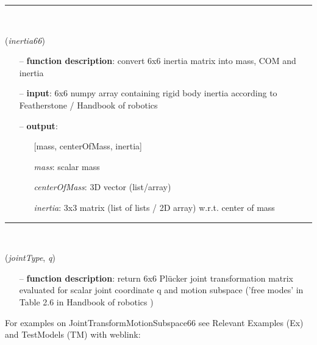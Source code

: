 \begin{itemize}[leftmargin=1.4cm]
\begin{itemize}[leftmargin=1.4cm]
\begin{itemize}[leftmargin=0.5cm]
\begin{itemize}[leftmargin=1.4cm]
\begin{itemize}[leftmargin=1.4cm]
\begin{itemize}[leftmargin=0.5cm]
\begin{itemize}[leftmargin=1.4cm]
\begin{itemize}[leftmargin=0.5cm]
\begin{itemize}[leftmargin=1.4cm]
\begin{itemize}[leftmargin=1.4cm]
\begin{itemize}[leftmargin=1.4cm]
%
\noindent\rule{8cm}{0.75pt}\vspace{1pt} \\ 
\begin{flushleft}
\label{sec:kinematicTree:Inertia66toMassCOMinertia}
({\it inertia66})
\end{flushleft}
\setlength{\itemindent}{0.7cm}
\begin{itemize}[leftmargin=0.7cm]
\item[--]{\bf function description}: convert 6x6 inertia matrix into mass, COM and inertia
\item[--]{\bf input}: 6x6 numpy array containing rigid body inertia according to Featherstone / Handbook of robotics \cite{Siciliano2016}
\item[--]{\bf output}: \vspace{-6pt}
\begin{itemize}[leftmargin=1.2cm]
\setlength{\itemindent}{-0.7cm}
\item[][mass, centerOfMass, inertia]
\item[]{\it mass}: scalar mass
\item[]{\it centerOfMass}: 3D vector (list/array)
\item[]{\it inertia}: 3x3 matrix (list of lists / 2D array) w.r.t. center of mass
\end{itemize}
\vspace{12pt}\end{itemize}
%
\noindent\rule{8cm}{0.75pt}\vspace{1pt} \\ 
\begin{flushleft}
\label{sec:kinematicTree:JointTransformMotionSubspace66}
({\it jointType}, {\it q})
\end{flushleft}
\setlength{\itemindent}{0.7cm}
\begin{itemize}[leftmargin=0.7cm]
\item[--]{\bf function description}: return 6x6 Pl\"ucker joint transformation matrix evaluated for scalar joint coordinate q and motion subspace ('free modes' in Table 2.6 in Handbook of robotics \cite{Siciliano2016})
\vspace{12pt}\end{itemize}
%
%
\noindent For examples on JointTransformMotionSubspace66 see Relevant Examples (Ex) and TestModels (TM) with weblink:

\end{itemize}
\end{itemize}
\end{itemize}
\end{itemize}
\end{itemize}
\end{itemize}
\end{itemize}
\end{itemize}
\end{itemize}
\end{itemize}
\end{itemize}
